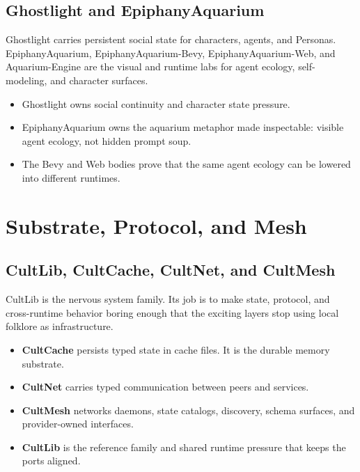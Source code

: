 \documentclass[11pt,oneside]{article}
\newcommand{\Term}[1]{\textbf{\color{cultgold}#1}}
\begin{document}
\subsection{Ghostlight and EpiphanyAquarium}

Ghostlight carries persistent social state for characters, agents, and Personas.
EpiphanyAquarium, EpiphanyAquarium-Bevy, EpiphanyAquarium-Web, and
Aquarium-Engine are the visual and runtime labs for agent ecology,
self-modeling, and character surfaces.

\begin{itemize}
  \item Ghostlight owns social continuity and character state pressure.
  \item EpiphanyAquarium owns the aquarium metaphor made inspectable: visible agent ecology, not hidden prompt soup.
  \item The Bevy and Web bodies prove that the same agent ecology can be lowered into different runtimes.
\end{itemize}

\section{Substrate, Protocol, and Mesh}

\subsection{CultLib, CultCache, CultNet, and CultMesh}

CultLib is the nervous system family. Its job is to make state, protocol, and
cross-runtime behavior boring enough that the exciting layers stop using local
folklore as infrastructure.

\begin{itemize}
  \item \Term{CultCache} persists typed state in cache files. It is the durable memory substrate.
  \item \Term{CultNet} carries typed communication between peers and services.
  \item \Term{CultMesh} networks daemons, state catalogs, discovery, schema surfaces, and provider-owned interfaces.
  \item \Term{CultLib} is the reference family and shared runtime pressure that keeps the ports aligned.
\end{itemize}
\end{document}
